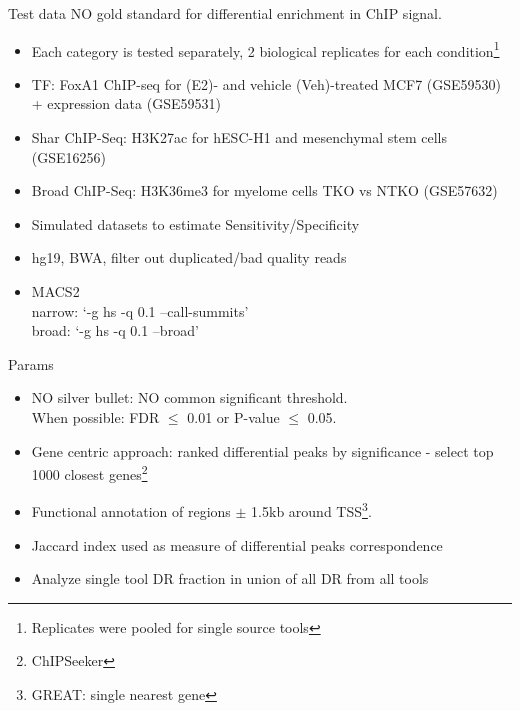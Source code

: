 \documentclass{beamer}
\begin{document}
\begin{frame}{Test data}
NO gold standard for differential enrichment in ChIP signal.
\begin{itemize}
\item Each category is tested separately, 2 biological replicates for each condition\footnote{Replicates were pooled for single source tools}
\item TF: FoxA1 ChIP-seq for (E2)- and vehicle (Veh)-treated MCF7 (GSE59530) + expression data (GSE59531)
\item Shar ChIP-Seq: H3K27ac for hESC-H1 and mesenchymal stem cells (GSE16256)
\item Broad ChIP-Seq: H3K36me3 for myelome cells TKO vs NTKO (GSE57632)
\item Simulated datasets to estimate Sensitivity/Specificity
\item hg19, BWA, filter out duplicated/bad quality reads
\item MACS2 \\
narrow:  ‘-g hs -q 0.1 –call-summits’\\
broad: ‘-g hs -q 0.1 –broad’
\end{itemize}
\end{frame}

\begin{frame}{Params}
\begin{itemize}
\item NO silver bullet: NO common significant threshold. \\
When possible: FDR $\leq$ 0.01 or P-value $\leq$ 0.05.
\item Gene centric approach: ranked differential peaks by significance - select top 1000 closest genes\footnote{ChIPSeeker}
\item Functional annotation of regions $\pm$ 1.5kb around TSS\footnote{GREAT: single nearest gene}.
\item Jaccard index used as measure of differential peaks correspondence
\item Analyze single tool DR fraction in union of all DR from all tools
\end{itemize}
\end{frame}
\end{document}
